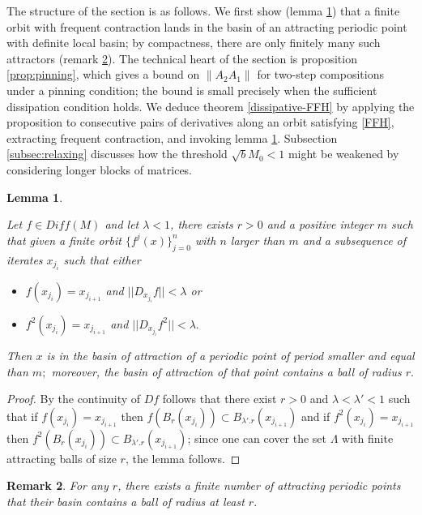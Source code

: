 \documentclass[a4paper,11pt]{article}
\newtheorem{lemma}{Lemma}
\newtheorem{remark}[lemma]{Remark}
\theoremstyle{definition}
\def\La{\Lambda}
\def\la{\lambda}
\def\La{\Lambda}
\begin{document}
The structure of the section is as follows. We first show (lemma \ref{finite-basin}) that a finite orbit with frequent contraction lands in the basin of an attracting periodic point with definite local basin; by compactness, there are only finitely many such attractors (remark \ref{finite-attracting}). The technical heart of the section is proposition \ref{prop:pinning}, which gives a bound on $\|A_2 A_1\|$ for two-step compositions under a pinning condition; the bound is small precisely when the sufficient dissipation condition holds. We deduce theorem \ref{dissipative-FFH} by applying the proposition to consecutive pairs of derivatives along an orbit satisfying \eqref{FFH}, extracting frequent contraction, and invoking lemma \ref{finite-basin}. Subsection \ref{subsec:relaxing} discusses how the threshold $\sqrt{b}M_0 < 1$ might be weakened by considering longer blocks of matrices.

\begin{lemma}\label{finite-basin}
    
Let $f\in Diff(M)$ and let $\la<1$, 
there exists $r>0$ and a positive integer $m$ such that given a finite orbit $\{f^j(x)\}_{j=0}^n$ with $n$ larger than $m$ and a subsequence of iterates $x_{j_i}$ such that   either 
\begin{itemize}
    \item[--] $f(x_{j_i})=x_{j_{i+1}}$ and $||D_{x_{j_i}}f||<\la$ or

    \item[--] $f^2(x_{j_i})=x_{j_{i+1}}$ and $||D_{x_{j_i}}f^2||<\la.$
\end{itemize} 
Then $x$ is in the basin of attraction of a periodic point of period smaller and equal than $m;$ moreover, the basin of attraction of that point contains a ball of radius $r.$
\end{lemma}

\begin{proof} By the continuity of $Df$  follows that there exist $r>0$ and $\la<\la'<1$ such that if $f(x_{j_i})=x_{j_{i+1}}$ then $f(B_r(x_{j_i}))\subset B_{\la'.r}(x_{j_{i+1}})$ and if $f^2(x_{j_i})=x_{j_{i+1}}$ then $f^2(B_r(x_{j_i}))\subset B_{\la'.r}(x_{j_{i+1}})$; since one can cover the set $\La$ with finite attracting  balls of size $r$, the lemma follows.
    
\end{proof}


\begin{remark}\label{finite-attracting} For any $r$, there exists a finite number of attracting periodic points that their basin contains a ball of radius at least $r.$ 
    
\end{remark}
\end{document}
